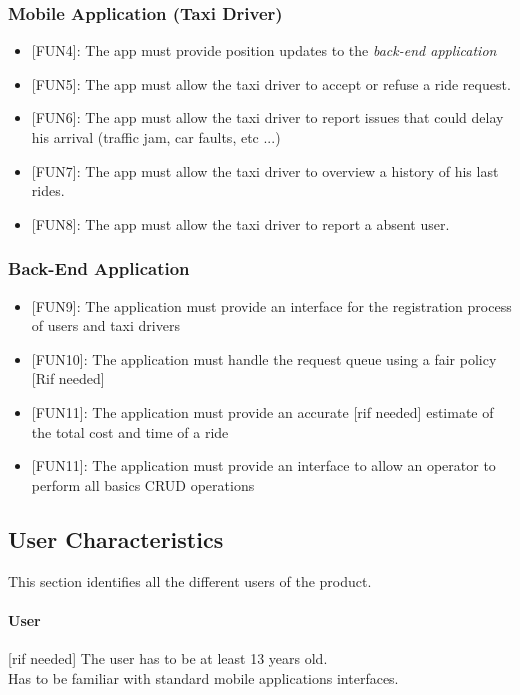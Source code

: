 \documentclass[12pt, a4paper]{article}
\begin{document}
\subsubsection{Mobile Application (Taxi Driver)} %
\label{ssub:mobile_application_}
\begin{itemize}
	\item {[FUN4\label{itm:FUN4}]}: The app must provide position updates to the \emph{back-end application}
	\item {[FUN5\label{itm:FUN5}]}: The app must allow the taxi driver to accept or refuse a ride request.
	\item {[FUN6\label{itm:FUN6}]}: The app must allow the taxi driver to report issues that could delay his arrival (traffic jam, car faults, etc ...)
	\item {[FUN7\label{itm:FUN7}]}: The app must allow the taxi driver to overview a history of his last rides.
	\item {[FUN8\label{itm:FUN8}]}: The app must allow the taxi driver to report a absent user.
\end{itemize}

\subsubsection{Back-End Application} 
\label{ssub:back_end_application}
\begin{itemize}
	\item {[FUN9\label{itm:FUN9}]}: The application must provide an interface for the registration process of users and taxi drivers
	\item {[FUN10\label{itm:FUN10}]}: The application must handle the request queue using a fair policy [Rif needed]
	\item {[FUN11\label{itm:FUN11}]}: The application must provide an accurate [rif needed] estimate of the total cost and time of a ride
	\item {[FUN11\label{itm:FUN12}]}: The application must provide an interface to allow an operator to perform all basics CRUD operations

\end{itemize}

\subsection{User Characteristics} 
\label{sub:user_characteristics}
This section identifies all the different users of the product.
\paragraph{User}\label{par:user} [rif needed] The user has to be at least 13 years old.\\ 
Has to be familiar with standard mobile applications interfaces.
\end{document}
